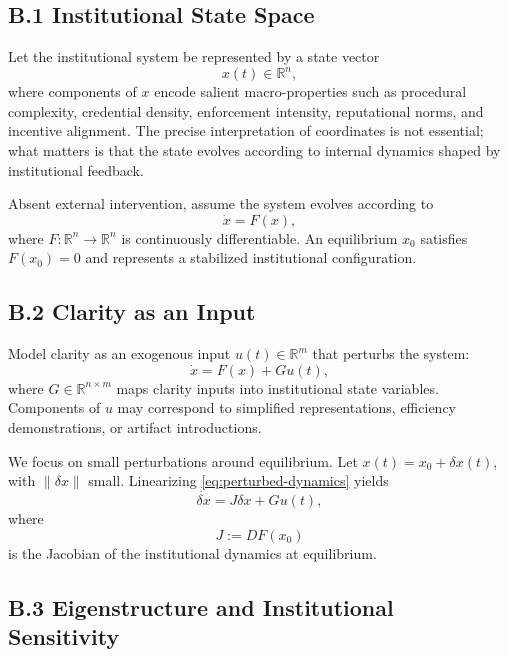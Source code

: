 \documentclass[11pt]{article}
\begin{document}
\subsection{B.1 Institutional State Space}

Let the institutional system be represented by a state vector
\[
x(t) \in \mathbb{R}^n,
\]
where components of \(x\) encode salient macro-properties such as procedural complexity, credential density, enforcement intensity, reputational norms, and incentive alignment. The precise interpretation of coordinates is not essential; what matters is that the state evolves according to internal dynamics shaped by institutional feedback.

Absent external intervention, assume the system evolves according to
\begin{equation}
\dot{x} = F(x),
\label{eq:institution-dynamics}
\end{equation}
where \(F:\mathbb{R}^n \to \mathbb{R}^n\) is continuously differentiable. An equilibrium \(x_0\) satisfies \(F(x_0)=0\) and represents a stabilized institutional configuration.

\subsection{B.2 Clarity as an Input}

Model clarity as an exogenous input \(u(t)\in\mathbb{R}^m\) that perturbs the system:
\begin{equation}
\dot{x} = F(x) + G u(t),
\label{eq:perturbed-dynamics}
\end{equation}
where \(G \in \mathbb{R}^{n\times m}\) maps clarity inputs into institutional state variables. Components of \(u\) may correspond to simplified representations, efficiency demonstrations, or artifact introductions.

We focus on small perturbations around equilibrium. Let \(x(t)=x_0 + \delta x(t)\), with \(\|\delta x\|\) small. Linearizing \eqref{eq:perturbed-dynamics} yields
\begin{equation}
\dot{\delta x} = J \delta x + G u(t),
\label{eq:linearized}
\end{equation}
where
\[
J := DF(x_0)
\]
is the Jacobian of the institutional dynamics at equilibrium.

\subsection{B.3 Eigenstructure and Institutional Sensitivity}
\end{document}

